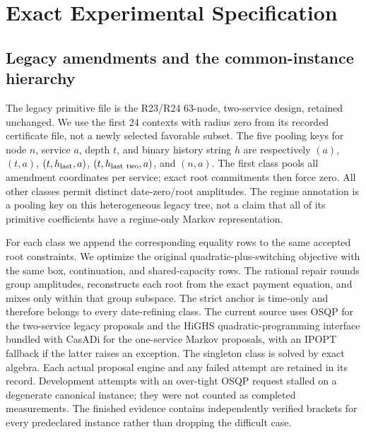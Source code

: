 \documentclass[11pt,letterpaper]{article}
\theoremstyle{definition}\newtheorem{remark}[theorem]{Remark}
\begin{document}
\section{Exact Experimental Specification}\label{ec:experiments}
\subsection{Legacy amendments and the common-instance hierarchy}
The legacy primitive file is the R23/R24 63-node, two-service design, retained unchanged. We use the first 24 contexts with radius zero from its recorded certificate file, not a newly selected favorable subset. The five pooling keys for node $n$, service $a$, depth $t$, and binary history string $h$ are respectively
$(a)$, $(t,a)$, $(t,h_{\rm last},a)$, $(t,h_{\rm last\ two},a)$, and $(n,a)$.
The first class pools all amendment coordinates per service; exact root commitments then force zero. All other classes permit distinct date-zero/root amplitudes. The regime annotation is a pooling key on this heterogeneous legacy tree, not a claim that all of its primitive coefficients have a regime-only Markov representation.

For each class we append the corresponding equality rows to the same accepted root constraints. We optimize the original quadratic-plus-switching objective with the same box, continuation, and shared-capacity rows. The rational repair rounds group amplitudes, reconstructs each root from the exact payment equation, and mixes only within that group subspace. The strict anchor is time-only and therefore belongs to every date-refining class. The current source uses OSQP for the two-service legacy proposals and the HiGHS quadratic-programming interface bundled with CasADi for the one-service Markov proposals, with an IPOPT fallback if the latter raises an exception. The singleton class is solved by exact algebra. Each actual proposal engine and any failed attempt are retained in its record. Development attempts with an over-tight OSQP request stalled on a degenerate canonical instance; they were not counted as completed measurements. The finished evidence contains independently verified brackets for every predeclared instance rather than dropping the difficult case.
\end{document}
